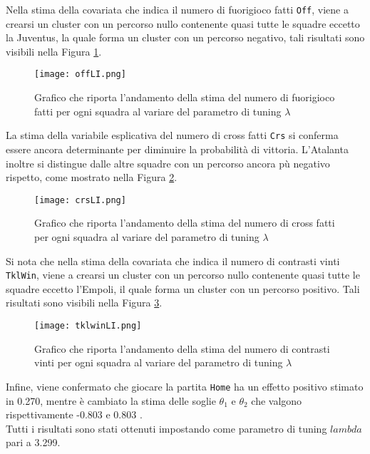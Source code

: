 Nella stima della covariata che indica il numero di fuorigioco fatti \texttt{Off}, viene a crearsi un cluster con un percorso nullo contenente quasi tutte le squadre eccetto la Juventus, la quale forma un cluster con un percorso negativo, tali risultati sono visibili nella Figura \ref{fig:offLI}.\\
\begin{figure}[htbp]
	\begin{center}
		\texttt{[image: offLI.png]}
		\caption{Grafico che riporta l'andamento della stima del numero di fuorigioco fatti per ogni squadra al variare del parametro di tuning $\lambda$} \label{fig:offLI}
	\end{center}
\end{figure}
La stima della variabile esplicativa del numero di cross fatti \texttt{Crs} si conferma essere ancora determinante per diminuire la probabilità di vittoria. L'Atalanta inoltre si distingue dalle altre squadre con un percorso ancora pù negativo rispetto, come mostrato nella Figura \ref{fig:crsLI}.\\
\begin{figure}[htbp]
	\begin{center}
		\texttt{[image: crsLI.png]}
		\caption{Grafico che riporta l'andamento della stima del numero di cross fatti per ogni squadra al variare del parametro di tuning $\lambda$} \label{fig:crsLI}
	\end{center}
\end{figure}
Si nota che nella stima della covariata che indica il numero di contrasti vinti \texttt{TklWin}, viene a crearsi un cluster con un percorso nullo contenente quasi tutte le squadre eccetto l'Empoli, il quale forma un cluster con un percorso positivo. Tali risultati sono visibili nella Figura \ref{fig:tklwinLI}.\\
\begin{figure}[htbp]
	\begin{center}
		\texttt{[image: tklwinLI.png]}
		\caption{Grafico che riporta l'andamento della stima del numero di contrasti vinti per ogni squadra al variare del parametro di tuning $\lambda$} \label{fig:tklwinLI}
	\end{center}
\end{figure}
Infine, viene confermato che giocare la partita \texttt{Home} ha un effetto positivo stimato in 0.270, mentre è cambiato la stima delle soglie $\theta_1$ e $\theta_2$ che valgono rispettivamente -0.803  e 0.803 .\\
Tutti i risultati sono stati ottenuti impostando come parametro di tuning $lambda$ pari a 3.299.\\

